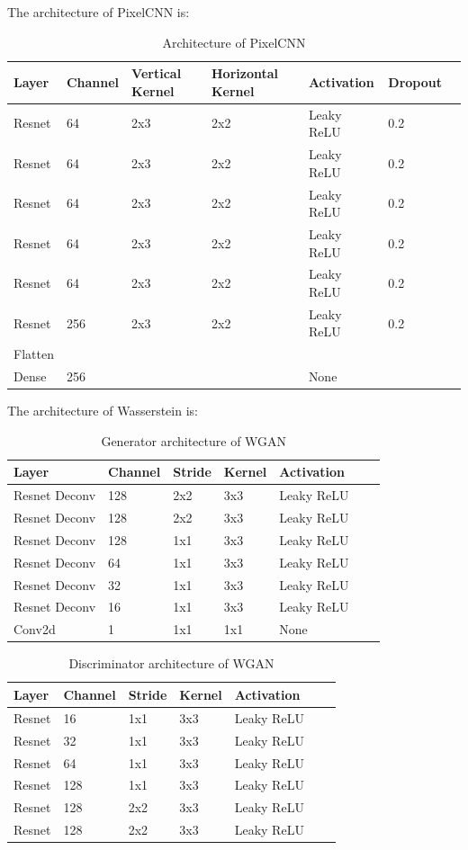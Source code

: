 \documentclass[a3paper]{article}
\begin{document}
The architecture of PixelCNN is: 

\begin{table}[H]
\centering
\begin{tabular}{lllllll}
Layer     & Channel & Vertical Kernel & Horizontal Kernel& Activation & Dropout  \\
\toprule
Resnet & 64 & 2x3 & 2x2 & Leaky ReLU & 0.2\\
Resnet & 64 & 2x3 & 2x2 & Leaky ReLU & 0.2\\
Resnet & 64 & 2x3 & 2x2 & Leaky ReLU & 0.2\\
Resnet & 64 & 2x3 & 2x2 & Leaky ReLU & 0.2\\
Resnet & 64 & 2x3 & 2x2 & Leaky ReLU & 0.2\\
Resnet & 256 & 2x3 & 2x2 & Leaky ReLU & 0.2\\
Flatten & \\
Dense & 256 &  &  & None \\
\bottomrule
\end{tabular}
\caption{Architecture of PixelCNN}
\end{table}


The architecture of Wasserstein is: 

\begin{table}[H]
\centering
\begin{tabular}{lllllll}
Layer     & Channel & Stride & Kernel & Activation  \\
\toprule
Resnet Deconv & 128 & 2x2 & 3x3 & Leaky ReLU \\
Resnet Deconv & 128 & 2x2 & 3x3 & Leaky ReLU \\
Resnet Deconv & 128 & 1x1 & 3x3 & Leaky ReLU \\
Resnet Deconv & 64 & 1x1 & 3x3 & Leaky ReLU \\
Resnet Deconv & 32 & 1x1 & 3x3 & Leaky ReLU \\
Resnet Deconv & 16 & 1x1 & 3x3 & Leaky ReLU \\
Conv2d & 1 & 1x1 & 1x1 & None \\
\bottomrule
\end{tabular}
\caption{Generator architecture of WGAN}
\end{table}

\begin{table}[H]
\centering
\begin{tabular}{lllllll}
Layer     & Channel & Stride & Kernel & Activation  \\
\toprule
Resnet & 16 & 1x1 & 3x3 & Leaky ReLU \\
Resnet & 32 & 1x1 & 3x3 & Leaky ReLU \\
Resnet & 64 & 1x1 & 3x3 & Leaky ReLU \\
Resnet & 128 & 1x1 & 3x3 & Leaky ReLU \\
Resnet & 128 & 2x2 & 3x3 & Leaky ReLU \\
Resnet & 128 & 2x2 & 3x3 & Leaky ReLU \\
\bottomrule
\end{tabular}
\caption{Discriminator architecture of WGAN}
\end{table}
\end{document}
